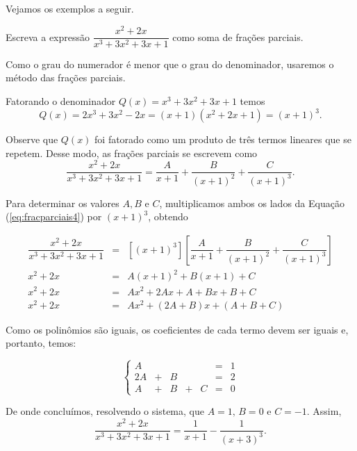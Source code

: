 Vejamos os exemplos a seguir.

\begin{exem}
    Escreva a expressão $\dfrac{x^2 + 2x}{x^3 + 3x^2 + 3x + 1}$ como soma de frações parciais.

    Como o grau do numerador é menor que o grau do denominador, usaremos o método das frações parciais.

    Fatorando o denominador $Q(x) = x^3 + 3x^2 + 3x + 1$ temos $$Q(x) = 2x^3 + 3x^2 - 2x = (x+1)(x^2 + 2x +1) = (x+1)^3.$$

    Observe que $Q(x)$ foi fatorado como um produto de três termos lineares que se repetem. Desse modo, as frações parciais se escrevem como 
    \begin{equation}
    \label{eq:fracparciais4}
    \dfrac{x^2 + 2x}{x^3 + 3x^2 + 3x + 1} = \dfrac{A}{x+1} + \dfrac{B}{(x+1)^2} + \dfrac{C}{(x+1)^3}.
    \end{equation}

    Para determinar os valores $A, B$ e $C$, multiplicamos ambos os lados da Equação (\ref{eq:fracparciais4}) por $(x+1)^3$, obtendo

    \begin{eqnarray*}
    [(x+1)^3]\dfrac{x^2 + 2x}{x^3 + 3x^2 +3x +1} & = & [(x+1)^3] \left[\dfrac{A}{x+1} + \dfrac{B}{(x+1)^2}+\dfrac{C}{(x+1)^3}\right]\\[5pt]
    x^2 + 2x & =& A(x+1)^2 + B(x+1) + C \\[5pt]
    x^2 + 2x & =& Ax^2 + 2Ax + A + Bx + B + C\\[5pt]
    x^2 + 2x & = & Ax^2 + (2A + B)x + (A + B + C)
    \end{eqnarray*}

    Como os polinômios são iguais, os coeficientes de cada termo devem ser iguais e, portanto, temos:

    \begin{equation*}
    \left\{ \begin{array}{ccccccc} 
    A &  &  &  &  &=& 1 \\[5pt]
    2A & + & B &  & &=& 2\\[5pt]
    A & + & B & + & C &=& 0
    \end{array}
    \right.    
    \end{equation*}

    De onde concluímos, resolvendo o sistema, que $A = 1, \, B = 0$ e $C = -1$. Assim, $$\dfrac{x^2 + 2x}{x^3 + 3x^2 +3x + 1} = \dfrac{1}{x+1} - \dfrac{1}{(x+3)^3}.$$
 \end{exem}

